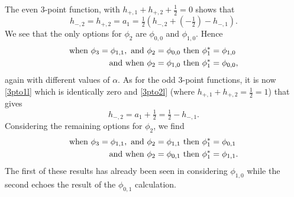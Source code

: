 \documentclass[a4paper,12pt]{article}
\def\hf          {\tfrac{1}{2}}
\begin{document}
The even 3-point function, with $h_{+,1}+h_{+,2}+\hf=0$ shows that
\begin{equation}
h_{-,2}=h_{+,2}=a_1=\hf\left(h_{-,2}+\left(-\hf\right)-h_{-,1}\right).
\end{equation}
We see that the only options for $\phi_2$ are $\phi_{0,0}$ and
$\phi_{1,0}$.  Hence
\begin{align}
\textrm{when } \phi_3=\phi_{1,1},\textrm{ and } & \phi_2=\phi_{0,0}
\textrm{ then } \phi^*_1=\phi_{1,0}\notag\\
\textrm{and when }  & \phi_2=\phi_{1,0} \textrm{ then } \phi^*_1=\phi_{0,0},
\end{align}
again with different values of $\alpha$.  As for the odd 3-point
functions, it is now \eqref{3pto1l} which is identically zero and
\eqref{3pto2l} (where $h_{+,1}+h_{+,2}=\hf=1$) that gives
\begin{equation}
h_{-,2}=a_1+\hf=\hf-h_{-,1}.
\end{equation} 
Considering the remaining options for $\phi_2$, we find
\begin{align}
\textrm{when } \phi_3=\phi_{1,1}, \textrm{ and }& \phi_2=\phi_{1,1}
\textrm{ then } \phi^*_1= \phi_{0,1}\notag\\
\textrm{and when }&\phi_2=\phi_{0,1} \textrm{ then } \phi^*_1=\phi_{1,1}.  
\end{align} 
The first of these results has already been seen in considering
$\phi_{1,0}$ while the second echoes the result of the $\phi_{0,1}$
calculation. 
\end{document}
